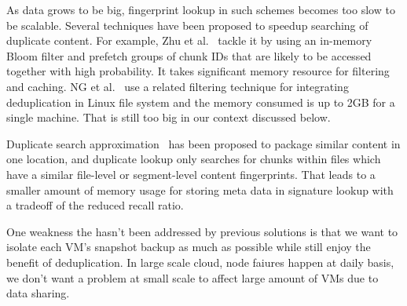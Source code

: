 As data grows to be big, fingerprint lookup in such schemes
becomes too slow to be scalable.
Several techniques have been proposed to speedup searching of duplicate 
content. For example,  
Zhu et al.~\cite{bottleneck08} tackle it 
by using an in-memory Bloom filter and prefetch groups of chunk IDs that are likely to be 
accessed together with high probability. It takes significant memory resource for filtering and caching.
NG et al.~\cite{ NGmiddleware2011}  use  
a related filtering technique for integrating deduplication in Linux  file system and the memory
consumed is up to 2GB for a single machine. That is still too big in our context discussed below. 

Duplicate  search approximation~\cite{extreme_binning09,sparseindex09}  has been proposed 
to package similar content in one location, and duplicate lookup  only searches
for chunks within files which have a similar file-level or segment-level  content fingerprints.
That leads  to a smaller amount of memory usage for storing meta data in signature
lookup with a tradeoff of the reduced recall ratio. 

One weakness the hasn't been addressed by previous solutions is that we want to isolate 
each VM's snapshot backup as much as possible while still enjoy the benefit of deduplication.
In large scale cloud, node faiures happen at daily basis, we don't want a problem at small scale
to affect large amount of VMs due to data sharing.

